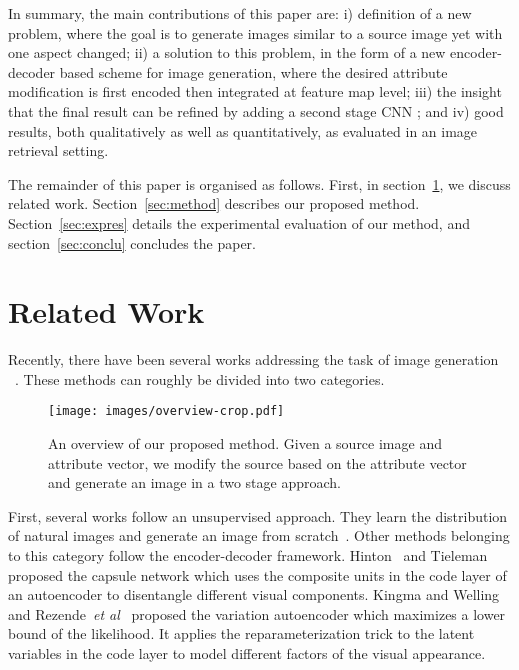 \documentclass[10pt,twocolumn,letterpaper]{article}
\def\etal{\emph{et al}\onedot}
\begin{document}
In summary, the main contributions of this paper are: i) definition of a new problem, where the goal
is to generate images similar to a source image yet with one aspect changed;
ii) a solution to this problem, %
in the form of a new encoder-decoder based scheme for image generation, where the desired attribute
modification is first encoded then integrated at feature map level;
iii) the insight that the final result can be refined by adding a second stage CNN ; 
and iv) good results, both qualitatively as well as quantitatively, as evaluated in an image retrieval setting.

The remainder of this paper is organised as follows. 
First, in section~\ref{sec:related}, we discuss related work. 
Section~\ref{sec:method} describes our proposed method.
Section~\ref{sec:expres} details the experimental evaluation of our method,
and section~\ref{sec:conclu} concludes the paper. 

\vspace{-1mm}
\section{Related Work}
\label{sec:related}
Recently, there have been several works addressing the task of image generation
~\cite{Dosovitskiy-cvpr15, Denton-nips15, Gauthier-14, Goodfellow-nips14, Hinton-icann11, Kingma-iclr14, Kulkarni-nips15, Li-icml15, Rezende-icml14, Tieleman-Thesis, Yang-nips15, Yim-cvpr15, zhu2013deep, zhu-nips14}.
These methods can roughly be divided into two categories.

\begin{figure*}[t]
\begin{center}
    \texttt{[image: images/overview-crop.pdf]}
\end{center}
\caption{An overview of our proposed method. Given a source image and attribute vector, we modify the source based on the attribute vector and generate an image in a two stage approach.}
\label{fig:overview}
\end{figure*}

First, several works follow an unsupervised approach.
They learn the distribution of natural images and generate an image from scratch~\cite{Denton-nips15, Gauthier-14, Goodfellow-nips14, Li-icml15}.
Other methods belonging to this category follow the encoder-decoder framework.
Hinton~\cite{Hinton-icann11} and Tieleman~\cite{Tieleman-Thesis} proposed the capsule network 
which uses the composite units in the code layer of an autoencoder to disentangle different visual components.
Kingma and Welling~\cite{Kingma-iclr14} and Rezende~\etal~\cite{Rezende-icml14} proposed the variation autoencoder 
which maximizes a lower bound of the likelihood. 
It applies the reparameterization trick to the latent variables in the code layer to model different factors of the visual appearance.
\end{document}
